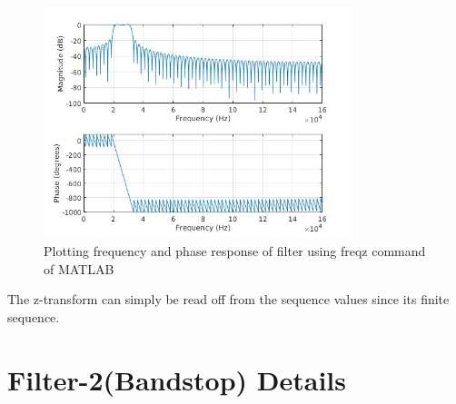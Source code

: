 \documentclass[12pt]{article}
\begin{document}
\begin{figure}[h!]
	\centering
    \includegraphics[width = 0.8\textwidth]{1fir.jpg}
    \caption{Plotting frequency and phase response of filter using freqz command of MATLAB}
\end{figure}
The z-transform can simply be read off from the sequence values since its finite sequence.
\newpage
\section{Filter-2(Bandstop) Details}
\end{document}
